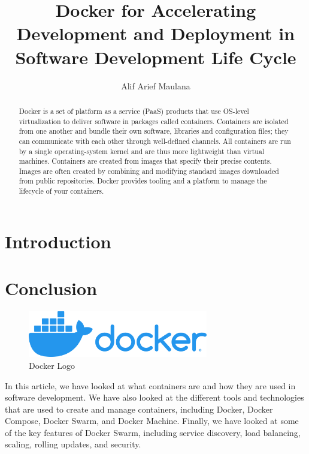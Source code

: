 \documentclass[10pt, a4paper]{article}
\begin{document}
\title{\textbf{Docker for Accelerating Development and Deployment in Software Development Life Cycle}}
\author{Alif Arief Maulana}

\maketitle

\begin{abstract}
Docker is a set of platform as a service (PaaS) products that use OS-level virtualization to deliver software in packages called containers. Containers are isolated from one another and bundle their own software, libraries and configuration files; they can communicate with each other through well-defined channels. All containers are run by a single operating-system kernel and are thus more lightweight than virtual machines. Containers are created from images that specify their precise contents. Images are often created by combining and modifying standard images downloaded from public repositories. Docker provides tooling and a platform to manage the lifecycle of your containers.
\end{abstract}



\section{Introduction}

\section{Conclusion}

\begin{figure}[h]
    \centering
    \includegraphics[width=0.7\textwidth]{./resources/images/horizontal-logo-monochromatic-white.png}
    \caption{Docker Logo}
    \label{fig:docker-logo}
\end{figure}

\clearpage

In this article, we have looked at what containers are and how they are used in software development. We have also looked at the different tools and technologies that are used to create and manage containers, including Docker, Docker Compose, Docker Swarm, and Docker Machine. Finally, we have looked at some of the key features of Docker Swarm, including service discovery, load balancing, scaling, rolling updates, and security.
\end{document}
